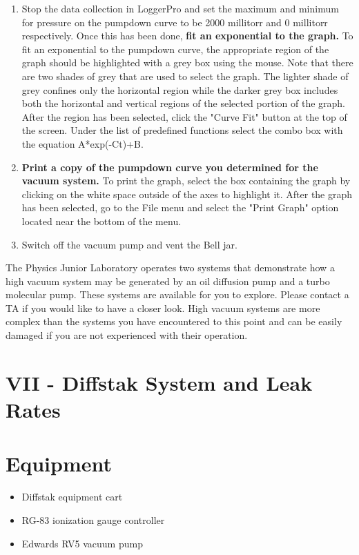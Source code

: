 \begin{enumerate}
\item Stop the data collection in LoggerPro and set the maximum and minimum for pressure on the pumpdown curve to be 2000 millitorr and 0 millitorr respectively. Once this has been done, {\bf fit an exponential to the graph.} To fit an exponential to the pumpdown curve, the appropriate region of the graph should be highlighted with a grey box using the mouse. Note that there are two shades of grey that are used to select the graph. The lighter shade of grey confines only the horizontal region while the darker grey box includes both the horizontal and vertical regions of the selected portion of the graph. After the region has been selected, click the "Curve Fit" button at the top of the screen. Under the list of predefined functions select the combo box with the equation A*exp(-Ct)+B.

\item {\bf Print a copy of the pumpdown curve you determined for the vacuum system.} To print the graph, select the box containing the graph by clicking on the white space outside of the axes to highlight it. After the graph has been selected, go to the File menu and select the "Print Graph" option located near the bottom of the menu.

\item Switch off the vacuum pump and vent the Bell jar.
\end{enumerate}

The Physics Junior Laboratory operates two systems that demonstrate how a high vacuum system may be generated by an oil diffusion pump and a turbo molecular pump. These systems are available for you to explore. Please contact a TA if you would like to have a closer look. High vacuum systems are more complex than the systems you have encountered to this point and can be easily damaged if you are not experienced with their operation.

\section{VII - Diffstak System and Leak Rates}

\section{Equipment}

\begin{minipage}[t]{0.5\textwidth}
\begin{itemize}[noitemsep]
\item Diffstak equipment cart
\item RG-83 ionization gauge controller
\end{itemize}
\end{minipage}
\begin{minipage}[t]{0.5\textwidth}
\begin{itemize}[noitemsep]
\item Edwards RV5 vacuum pump
\end{itemize}
\end{minipage}

